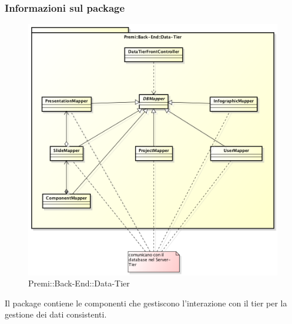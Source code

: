 	\subsubsection*{Informazioni sul package}
		\begin{figure}[h]
			\centering
			\includegraphics[width=0.9\linewidth]{img/back-end_data-tier}
			\caption[Premi::Back-End::Data-Tier]{Premi::Back-End::Data-Tier}
		\end{figure}
		Il package contiene le componenti che gestiscono l'interazione con il tier per la gestione dei dati consistenti.
		
